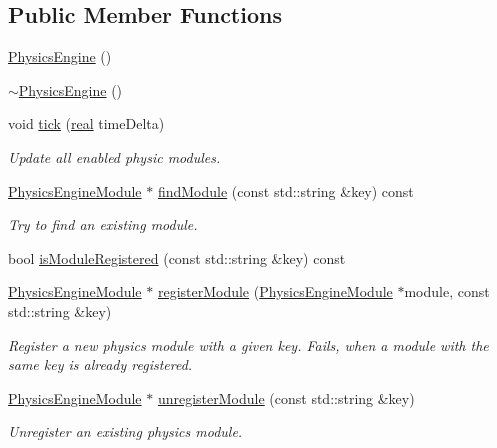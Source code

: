 \subsection*{Public Member Functions}
\begin{DoxyCompactItemize}
\item 
\mbox{\hyperlink{classr3_1_1_physics_engine_a15ef3c7b786475bec9e2afb24d48ffea}{Physics\+Engine}} ()
\item 
\mbox{\hyperlink{classr3_1_1_physics_engine_a37558d625c57485a92a8fc46697fd11c}{$\sim$\+Physics\+Engine}} ()
\item 
void \mbox{\hyperlink{classr3_1_1_physics_engine_aba6b8345f61da6e9e1baa6c745eb1803}{tick}} (\mbox{\hyperlink{namespacer3_ab2016b3e3f743fb735afce242f0dc1eb}{real}} time\+Delta)
\begin{DoxyCompactList}\small\item\em Update all enabled physic modules. \end{DoxyCompactList}\item 
\mbox{\hyperlink{classr3_1_1_physics_engine_module}{Physics\+Engine\+Module}} $\ast$ \mbox{\hyperlink{classr3_1_1_physics_engine_a60779849b362a1b1b43ef2898c90a3ac}{find\+Module}} (const std\+::string \&key) const
\begin{DoxyCompactList}\small\item\em Try to find an existing module. \end{DoxyCompactList}\item 
bool \mbox{\hyperlink{classr3_1_1_physics_engine_ad24c27b1288eb3b4d18be70a5e257e4b}{is\+Module\+Registered}} (const std\+::string \&key) const
\item 
\mbox{\hyperlink{classr3_1_1_physics_engine_module}{Physics\+Engine\+Module}} $\ast$ \mbox{\hyperlink{classr3_1_1_physics_engine_aead3d2707fa52fc65701a55b811b571e}{register\+Module}} (\mbox{\hyperlink{classr3_1_1_physics_engine_module}{Physics\+Engine\+Module}} $\ast$module, const std\+::string \&key)
\begin{DoxyCompactList}\small\item\em Register a new physics module with a given key. Fails, when a module with the same key is already registered. \end{DoxyCompactList}\item 
\mbox{\hyperlink{classr3_1_1_physics_engine_module}{Physics\+Engine\+Module}} $\ast$ \mbox{\hyperlink{classr3_1_1_physics_engine_a54dfdfda1b3f7eb33e9603d247f45aa8}{unregister\+Module}} (const std\+::string \&key)
\begin{DoxyCompactList}\small\item\em Unregister an existing physics module. \end{DoxyCompactList}\item 

\end{DoxyCompactItemize}
